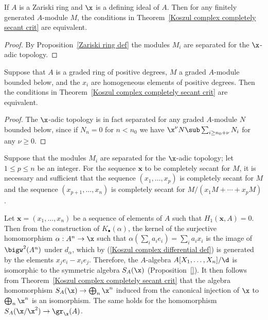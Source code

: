 \begin{corollary}\label{Koszul sequence Zariski ring complete secant is regular}
If $A$ is a Zariski ring and $\x$ is a defining ideal of $A$. Then for any finitely generated $A$-module $M$, the conditions in Theorem~\ref{Koszul complex completely secant crit} are equivalent.
\end{corollary}
\begin{proof}
By Proposition~\ref{Zariski ring def} the modules $M_i$ are separated for the $\x$-adic topology.
\end{proof}
\begin{corollary}\label{Koszul sequence graded ring complete secant is regular}
Suppose that $A$ is a graded ring of positive degrees, $M$ a graded $A$-module bounded below, and the $x_i$ are homogeneous elements of positive degrees. Then the conditions in Theorem~\ref{Koszul complex completely secant crit} are equivalent.
\end{corollary}
\begin{proof}
The $\x$-adic topology is in fact separated for any graded $A$-module $N$ bounded below, since if $N_n=0$ for $n<n_0$ we have $\x^\nu N\sub\sum_{i\geq n_0+\nu}N_i$ for any $\nu\geq 0$.
\end{proof}
\begin{corollary}\label{Koszul sequence complete secant truncation}
Suppose that the modules $M_i$ are separated for the $\x$-adic topology; let $1\leq p\leq n$ be an integer. For the sequence $\bm{x}$ to be completely secant for $M$, it is necessary and sufficient that the sequence $(x_1,\dots,x_p)$ is completely secant for $M$ and the sequence $(x_{p+1},\dots,x_n)$ is completely secant for $M/(x_1M+\cdots+x_pM)$.
\end{corollary}
\begin{remark}
Let $\bm{x}=(x_1,\dots,x_n)$ be a sequence of elements of $A$ such that $H_1(\bm{x},A)=0$. Then from the construction of $K_\bullet(\alpha)$, the kernel of the surjective homomorphism $\alpha:A^n\to\x$ such that $\alpha(\sum_ia_ie_i)=\sum_ia_ix_i$ is the image of $\bigw^2(A^n)$ under $d_\alpha$, which by (\ref{Koszul complex differential def}) is generated by the elements $x_je_i-x_ie_j$. Therefore, the $A$-algebra $A[X_1,\dots,X_n]/\d$ is isomorphic to the symmetric algebra $S_A(\x)$ (Proposition~\ref{}). It then follows from Theorem~\ref{Koszul complex completely secant crit} that the algebra homomorphism $S_A(\x)\to\bigoplus_n\x^n$ induced from the canonical injection of $\x$ to $\bigoplus_n\x^n$ is an isomorphism. The same holds for the homomorphism $S_A(\x/\x^2)\to\gr_\x(A)$. 
\end{remark}
